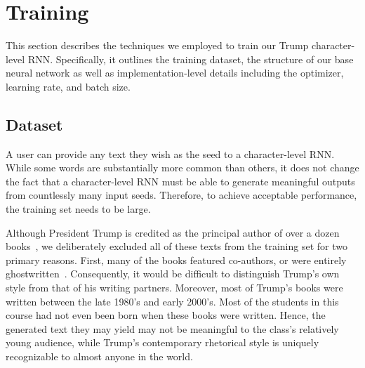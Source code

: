 \documentclass{article}
\begin{document}
\section{Training}\label{sec:training}

This section describes the techniques we employed to train our Trump character-level RNN.  Specifically, it outlines the training dataset, the structure of our base neural network as well as implementation-level details including the optimizer, learning rate, and batch size.

\subsection{Dataset}

A user can provide any text they wish as the seed to a character-level RNN.  While some words are substantially more common than others, it does not change the fact that a character-level RNN must be able to generate meaningful outputs from countlessly many input seeds. Therefore, to achieve acceptable performance, the training set needs to be large.

Although President Trump is credited as the principal author of over a dozen books~\cite{trumpArtOfTheDeal,trumpSurvivingAtTheTop,trumpArtOfTheComeback,trumpTheAmericaWeDeserve,trumpHowToGetRich,trumpCrippledAmerica,trumpTimeToGetTough,trumpThinkBig,trump101,trumpNeverGiveUp,trumpWhyWeWantYou,trumpBestGolfAdvice,trumpMidasTouch}, we deliberately excluded all of these texts from the training set for two primary reasons.  First, many of the books featured co-authors, or were entirely ghostwritten~\cite{mayerNewYorkerGhostwriter}.  Consequently, it would be difficult to distinguish Trump's own style from that of his writing partners.  Moreover, most of Trump's books were written between the late 1980's and early 2000's.  Most of the students in this course had not even been born when these books were written. Hence, the generated text they may yield may not be meaningful to the class's relatively young audience, while Trump's contemporary rhetorical style is uniquely recognizable to almost anyone in the world.
\end{document}
